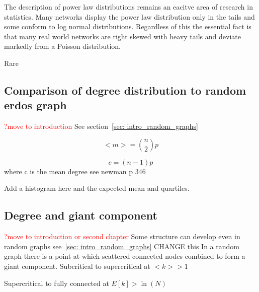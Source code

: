 The description of power law distributions remains an eacitve area of research in statistics. Many networks display the power law distribution only in the tails and some conform to log normal distributions. Regardless of this the essential fact is that many real world networks are right skewed with heavy tails and deviate markedly from a Poisson distribution. 




Rare \cite{broido2019scale}







\subsection{Comparison of degree distribution to random erdos graph}
\textcolor{red}{?move to introduction}
See section~\ref{sec: intro_random_graphs}

\begin{equation}
    <m> = \binom{n}{2}p
\end{equation}


\begin{equation}
    c = (n-1)p
\end{equation}
where c is the mean degree see newman p 346

Add a histogram here and the expected mean and quartiles.


\subsection{Degree and giant component}
\label{sec:connected component and degree}
\textcolor{red}{ ?move to introduction or second chapter}
Some structure can develop even in random graphs see~\ref{sec: intro_random_graphs}
 CHANGE this
In a random graph there is a point at which scattered connected nodes combined to form a giant component. Subcritical to supercritical at $<k> >1$


Supercritical to fully connected at $E[k] > \ln(N)$


